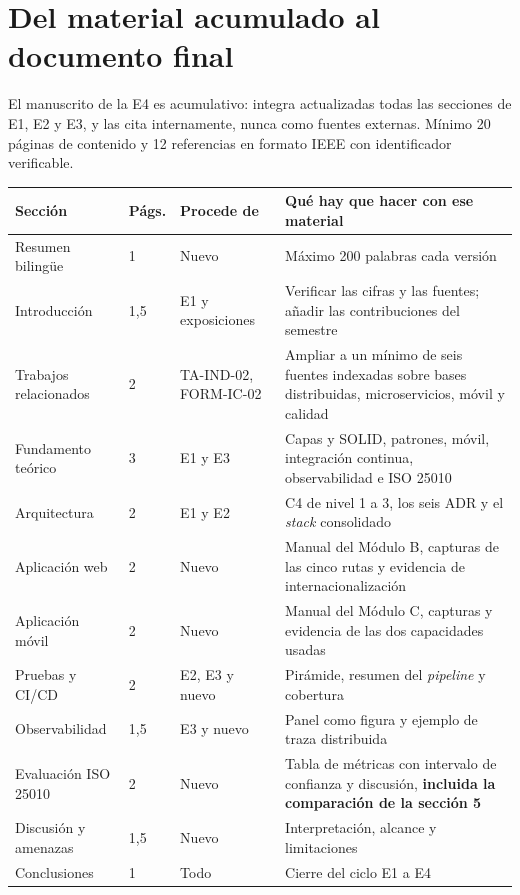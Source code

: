 \documentclass[11pt,a4paper]{article}
\begin{document}
\section{Del material acumulado al documento final}

El manuscrito de la E4 es acumulativo: integra actualizadas todas las secciones de E1, E2 y E3, y las cita internamente, nunca como fuentes externas. Mínimo 20 páginas de contenido y 12 referencias en formato IEEE con identificador verificable.

\begin{center}
	\footnotesize
	\begin{longtable}{@{}p{3.4cm}p{1.0cm}p{2.6cm}p{7.6cm}@{}}
		\toprule
		\textbf{Sección} & \textbf{Págs.} & \textbf{Procede de} & \textbf{Qué hay que hacer con ese material} \\
		\midrule
		\endhead
		Resumen bilingüe & 1 & Nuevo & Máximo 200 palabras cada versión \\
		Introducción & 1,5 & E1 y exposiciones & Verificar las cifras y las fuentes; añadir las contribuciones del semestre \\
		Trabajos relacionados & 2 & TA-IND-02, FORM-IC-02 & Ampliar a un mínimo de seis fuentes indexadas sobre bases distribuidas, microservicios, móvil y calidad \\
		Fundamento teórico & 3 & E1 y E3 & Capas y SOLID, patrones, móvil, integración continua, observabilidad e ISO 25010 \\
		Arquitectura & 2 & E1 y E2 & C4 de nivel 1 a 3, los seis ADR y el \emph{stack} consolidado \\
		Aplicación web & 2 & Nuevo & Manual del Módulo B, capturas de las cinco rutas y evidencia de internacionalización \\
		Aplicación móvil & 2 & Nuevo & Manual del Módulo C, capturas y evidencia de las dos capacidades usadas \\
		Pruebas y CI/CD & 2 & E2, E3 y nuevo & Pirámide, resumen del \emph{pipeline} y cobertura \\
		Observabilidad & 1,5 & E3 y nuevo & Panel como figura y ejemplo de traza distribuida \\
		Evaluación ISO 25010 & 2 & Nuevo & Tabla de métricas con intervalo de confianza y discusión, \textbf{incluida la comparación de la sección 5} \\
		Discusión y amenazas & 1,5 & Nuevo & Interpretación, alcance y limitaciones \\
		Conclusiones & 1 & Todo & Cierre del ciclo E1 a E4 \\
		\bottomrule
	\end{longtable}
\end{center}
\end{document}

